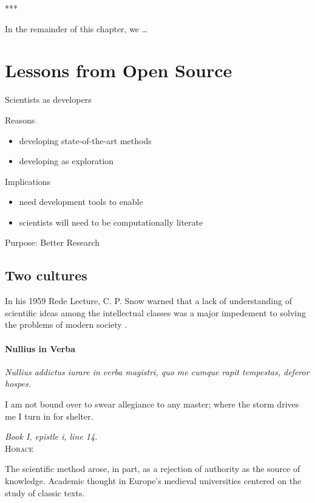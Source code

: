 \documentclass[ChapterTOCs,krantz2]{krantz} %
\newcommand{\parasep}{\begin{center}*\hspace{6em}*\hspace{6em}*\end{center}}
\begin{document}
\parasep

In the remainder of this chapter, we \ldots

\section{Lessons from Open Source}

Scientists as developers

Reasons

\begin{itemize}
\item  developing state-of-the-art methods
\item developing as exploration
\end{itemize}

Implications

\begin{itemize}
\item need development tools to enable
\item scientists will need to be computationally literate
\end{itemize}

Purpose:  Better Research

\subsection{Two cultures}

In his 1959 Rede Lecture, C. P. Snow warned that a lack of understanding
of scientific ideas among the intellectual classes was a major
impedement to solving the problems of modern society \cite{snow1960two}.

\paragraph{ {\bf Nullius in Verba}} 

\setlength{\epigraphrule}{0pt}
\setlength{\epigraphwidth}{.65\textwidth}
\epigraph%
{%
  \emph{Nullius addictus iurare in verba magistri,
  quo me cumque rapit tempestas, deferor hospes.}

  I am not bound over to swear allegiance to any master; where the storm
  drives me I turn in for shelter.
}%
{\textit{Book I, epistle i, line 14.}\\ \textsc{Horace} }

The scientific method arose, in part, as a rejection of authority as
the source of knowledge. Academic thought in Europe's medieval universities
centered on the study of classic texts.
\end{document}
